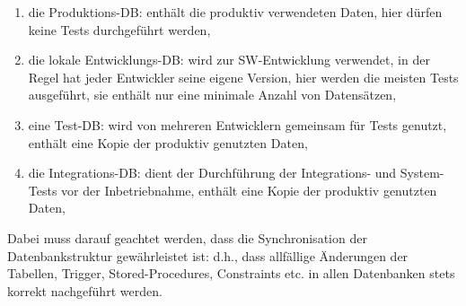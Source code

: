 \newslide
\begin{enumerate}
\item die Produktions-DB: enthält die produktiv verwendeten Daten,
  hier dürfen keine Tests durchgeführt werden,
\item die lokale Entwicklungs-DB: wird zur SW-Entwicklung verwendet,
  in der Regel hat jeder Entwickler seine eigene Version, hier werden
  die meisten Tests ausgeführt, sie enthält nur eine minimale Anzahl von
  Datensätzen,
\item eine Test-DB: wird von mehreren Entwicklern gemeinsam für Tests
  genutzt, enthält eine Kopie der produktiv genutzten Daten,
\item die Integrations-DB: dient der Durchführung der Integrations- und
  System-Tests vor der Inbetriebnahme,
  enthält eine Kopie der produktiv genutzten Daten,
 \end{enumerate}
Dabei muss darauf geachtet werden, dass die
Synchronisation der Datenbankstruktur gewährleistet
ist: d.h., dass allfällige Änderungen der Tabellen, Trigger,
Stored-Procedures, Constraints etc.  in allen Datenbanken
stets korrekt nachgeführt werden.

